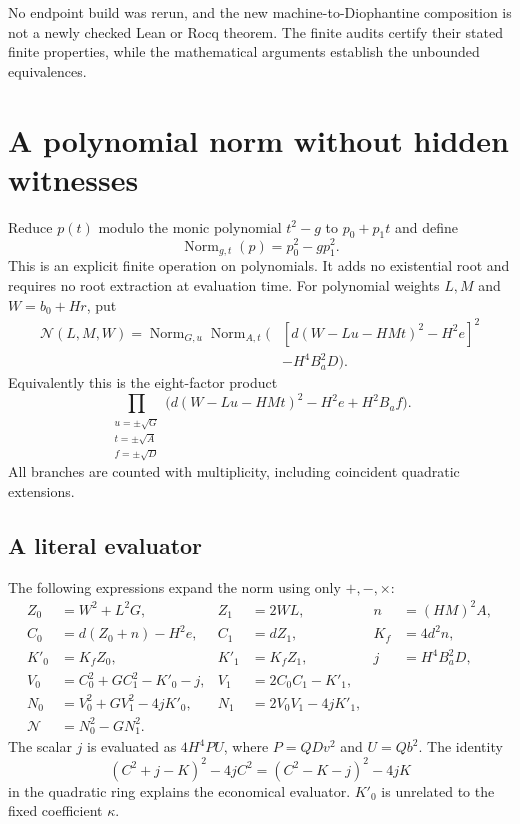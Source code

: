 \documentclass[11pt]{article}
\theoremstyle{remark}\newtheorem{remark}[theorem]{Remark}
\newcommand{\Norm}{\operatorname{Norm}}
\begin{document}
No endpoint build was rerun, and the new machine-to-Diophantine
composition is not a newly checked Lean or Rocq theorem.
The finite audits certify their stated finite properties, while the
mathematical arguments establish the unbounded equivalences.

\section{A polynomial norm without hidden witnesses}
\label{sec:norm}

Reduce \(p(t)\) modulo the monic polynomial \(t^2-g\) to \(p_0+p_1t\)
and define
\[
\Norm_{g,t}(p)=p_0^2-gp_1^2.
\tag{3.1}
\]
This is an explicit finite operation on polynomials. It adds no
existential root and requires no root extraction at evaluation time.
For polynomial weights \(L,M\) and \(W=b_0+Hr\), put
\[
\begin{split}
\mathcal N(L,M,W)=\Norm_{G,u}\Norm_{A,t}\bigl(
 &[d(W-Lu-HMt)^2-H^2e]^2\\
 &-H^4B_a^2D\bigr).
\end{split}
\tag{3.2}
\]
Equivalently this is the eight-factor product
\[
\prod_{\substack{u=\pm\sqrt G\\t=\pm\sqrt A\\f=\pm\sqrt D}}
\bigl(d(W-Lu-HMt)^2-H^2e+H^2B_af\bigr).
\tag{3.3}
\]
All branches are counted with multiplicity, including coincident
quadratic extensions.

\subsection{A literal evaluator}

The following expressions expand the norm using only \(+,-,\times\):
\begin{align}
Z_0&=W^2+L^2G,&Z_1&=2WL,&n&=(HM)^2A,\nonumber\\
C_0&=d(Z_0+n)-H^2e,&C_1&=dZ_1,&K_f&=4d^2n,\nonumber\\
K'_0&=K_fZ_0,&K'_1&=K_fZ_1,&j&=H^4B_a^2D,\tag{3.4}\\
V_0&=C_0^2+GC_1^2-K'_0-j,&V_1&=2C_0C_1-K'_1,\nonumber\\
N_0&=V_0^2+GV_1^2-4jK'_0,&N_1&=2V_0V_1-4jK'_1,\nonumber\\
\mathcal N&=N_0^2-GN_1^2.\nonumber
\end{align}
The scalar \(j\) is evaluated as \(4H^4PU\), where \(P=QDv^2\)
and \(U=Qb^2\). The identity
\[
(C^2+j-K)^2-4jC^2=(C^2-K-j)^2-4jK
\tag{3.5}
\]
in the quadratic ring explains the economical evaluator.
\(K'_0\) is unrelated to the fixed coefficient \(\kappa\).
\end{document}
